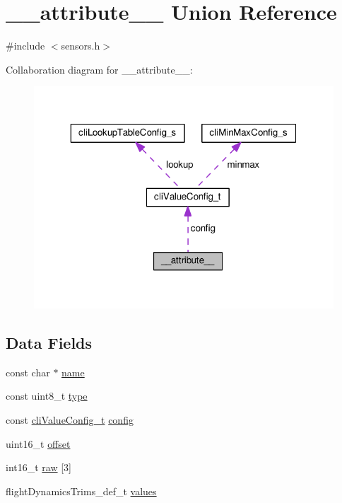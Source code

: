 \hypertarget{struct____attribute____}{\section{\+\_\+\+\_\+attribute\+\_\+\+\_\+ Union Reference}
\label{struct____attribute____}
}


{\ttfamily \#include $<$sensors.\+h$>$}



Collaboration diagram for \+\_\+\+\_\+attribute\+\_\+\+\_\+\+:\nopagebreak
\begin{figure}[H]
\begin{center}
\leavevmode
\includegraphics[width=319pt]{struct____attribute______coll__graph}
\end{center}
\end{figure}
\subsection*{Data Fields}
\begin{DoxyCompactItemize}
\item 
const char $\ast$ \hyperlink{struct____attribute_____a0d8e8bda3b9ea78615345402ce1b986a}{name}
\item 
const uint8\+\_\+t \hyperlink{struct____attribute_____a75c7081d1b709703f2844b6d005d12a9}{type}
\item 
const \hyperlink{unioncliValueConfig__t}{cli\+Value\+Config\+\_\+t} \hyperlink{struct____attribute_____a6ab60051a05ff8847ba000ce85d076e7}{config}
\item 
uint16\+\_\+t \hyperlink{struct____attribute_____ab1cb1c783cfc8f8eac63ab1c5a834c73}{offset}
\item 
int16\+\_\+t \hyperlink{struct____attribute_____a70ca0654a1cfdb92a7620f63cb22790d}{raw} \mbox{[}3\mbox{]}
\item 
flight\+Dynamics\+Trims\+\_\+def\+\_\+t \hyperlink{struct____attribute_____aeb21b2e8797e36156135a1ca01f284de}{values}
\end{DoxyCompactItemize}


